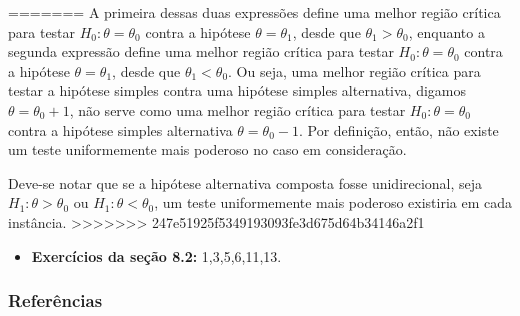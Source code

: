 \documentclass[12pt]{beamer}
\begin{document}
\begin{frame}{}
\begin{block}{}
=======
A primeira dessas duas expressões define uma melhor região crítica para testar $H_0 : \theta = \theta_0$ contra a hipótese $\theta = \theta_1$, desde que $\theta_1 > \theta_0$, enquanto a segunda expressão define uma melhor região crítica para testar $H_0 : \theta = \theta_0$ contra a hipótese $\theta = \theta_1$, desde que $\theta_1 < \theta_0$. Ou seja, uma melhor região crítica para testar a hipótese simples contra uma hipótese simples alternativa, digamos $\theta = \theta_0 + 1$, não serve como uma melhor região crítica para testar $H_0 : \theta = \theta_0$ contra a hipótese simples alternativa $\theta = \theta_0 - 1$. Por definição, então, não existe um teste uniformemente mais poderoso no caso em consideração.

Deve-se notar que se a hipótese alternativa composta fosse uni\-di\-re\-cio\-nal, seja $H_1 : \theta > \theta_0$ ou $H_1 : \theta < \theta_0$, um teste uniformemente mais poderoso existiria em cada instância.
>>>>>>> 247e51925f5349193093fe3d675d64b34146a2f1
\end{block}
\end{frame}

\begin{frame}{\Home}
\begin{block}{}
\justifying

\begin{itemize}
    \item \textbf{Exercícios da seção 8.2:} 1,3,5,6,11,13.
\end{itemize}
\end{block}
\nocite{hogg}
\end{frame}

\begin{frame}[allowframebreaks]
\frametitle{\bf Referências}
\printbibliography
\end{frame}
\end{document}
